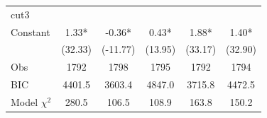 {\begin{tabular*}{\hsize}{@{\hskip\tabcolsep\extracolsep\fill}l*{5}{c}}
\midrule
cut3                &             &             &             &             &             \\
Constant            &        1.33*&       -0.36*&        0.43*&        1.88*&        1.40*\\
                    &     (32.33) &    (-11.77) &     (13.95) &     (33.17) &     (32.90) \\
\midrule
Obs                 &        1792 &        1798 &        1795 &        1792 &        1794 \\
BIC                 &      4401.5 &      3603.4 &      4847.0 &      3715.8 &      4472.5 \\
Model $\chi^{2}$    &       280.5 &       106.5 &       108.9 &       163.8 &       150.2 \\
\bottomrule
\end{tabular*}
}
